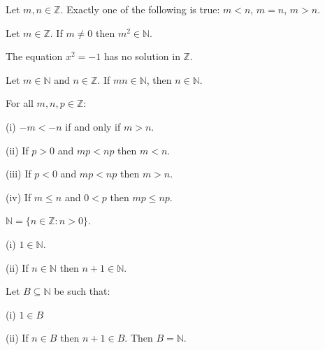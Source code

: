 \documentclass[12pt]{article}
\newenvironment{customprop}[1]{
  \renewcommand\theproposition{#1}
  \proposition
}{\endproposition}
\begin{document}
\begin{customprop}{2.8}
  Let \( m, n \in \mathbb{Z} \). Exactly one of the following is true: \( m < n \), \( m = n \), \( m > n \).
\end{customprop}

\begin{customprop}{2.9}
  Let \( m \in \mathbb{Z} \). If \( m \neq 0 \) then \( m^2 \in \mathbb{N} \).
\end{customprop}

\begin{customprop}{2.10}
  The equation \( x^2 = -1 \) has no solution in \( \mathbb{Z} \).
\end{customprop}

\begin{customprop}{2.11}
  Let \( m \in \mathbb{N} \) and \( n \in \mathbb{Z} \). If \( mn \in \mathbb{N} \), then \( n \in \mathbb{N} \).
\end{customprop}

\begin{customprop}{2.12}
  For all \( m, n, p \in \mathbb{Z} \):
  \item[(i)] \( -m < -n \) if and only if \( m > n \).
  \item[(ii)] If \( p > 0 \) and \( mp < np \) then \( m < n \).
  \item[(iii)] If \( p < 0 \) and \( mp < np \) then \( m > n \).
  \item[(iv)] If \( m \leq n \) and \( 0 < p \) then \( mp \leq np \).
\end{customprop}

\begin{customprop}{2.13}
  \( \mathbb{N} = \{ n \in \mathbb{Z} : n > 0 \} \).
\end{customprop}

\begin{customprop}{2.14}
  \item[(i)] \( 1 \in \mathbb{N} \).
  \item[(ii)] If \( n \in \mathbb{N} \) then \( n + 1 \in \mathbb{N} \).
\end{customprop}

\begin{customprop}{2.16}
  Let \( B \subseteq \mathbb{N} \) be such that:
  \item[(i)] \( 1 \in B \)
  \item[(ii)] If \( n \in B \) then \( n + 1 \in B \).
  Then \( B = \mathbb{N} \).
\end{customprop}
\end{document}
